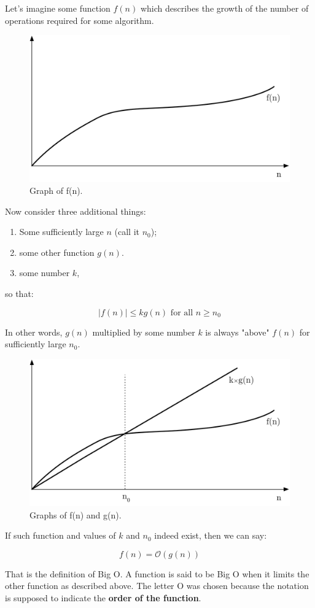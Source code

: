 \documentclass[a4paper, justified, notitlepage, sfsidenotes, notoc]{tufte-book}
\begin{document}
Let's imagine some function \(f(n)\) which describes the growth of the number of operations required for some algorithm.

\begin{figure}[htbp]
\includegraphics[width=.5\linewidth]{./images/big_o_theta_etc/fn.png}
\caption{\label{}
Graph of f(n).}
\end{figure}
Now consider three additional things:

\begin{enumerate}
\item Some sufficiently large \(n\) (call it \(n_{0}\));
\item some other function \(g(n)\).
\item some number \(k\),
\end{enumerate}

so that:

$$ \lvert f(n) \rvert \leq k g(n) \textrm{ for all } n \geq n_{0} $$

In other words, \(g(n)\) multiplied by some number \(k\) is always "above" \(f(n)\) for sufficiently large \(n_{0}\).

\begin{figure}[htbp]
\includegraphics[width=.5\linewidth]{./images/big_o_theta_etc/fn and gn.png}
\caption{\label{}
Graphs of f(n) and g(n).}
\end{figure}
If such function and values of \(k\) and \(n_{0}\) indeed exist, then we can say:

$$ f(n) = \mathcal{O}(g(n)) $$

That is the definition of Big O. A function is said to be Big O when it limits the other function as described above. The letter O was chosen because the notation is supposed to indicate the \textbf{order of the function}.
\end{document}
